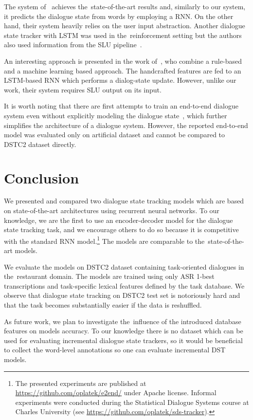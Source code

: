 \documentclass{itatnew}
\def\PB#1{\textcolor{red}{PB: \textit{#1}}}
\begin{document}
The system of~\citet{henderson2014word} achieves the~state-of-the-art results and, similarly to our system, it predicts the dialogue state from words by employing a RNN.
On the other hand, their system heavily relies on the user input abstraction.
Another dialogue state tracker with LSTM was used in the~reinforcement setting but the authors also used information from the SLU pipeline~\cite{lee2016dialog}.

An interesting approach is presented in the work of~\citet{vodolan2015hybrid}, who combine a rule-based and a machine learning based approach.
The handcrafted features are fed to an LSTM-based RNN which performs a dialog-state update.
However, unlike our work, their system requires SLU output on its input.

It is worth noting that there are first attempts to train an end-to-end dialogue system even without explicitly modeling the dialogue state~\cite{bordes2016learning}, which further simplifies the architecture of a dialogue system.
However, the reported end-to-end model was evaluated only on artificial dataset and cannot be compared to DSTC2 dataset directly.

\section{Conclusion}\label{sec:conc}
We presented and compared two dialogue state tracking models which are based on state-of-the-art architectures using recurrent neural networks.
To our knowledge, we are the first to use an encoder-decoder model for the dialogue state tracking task, and we encourage others to do so because it is competitive with the standard RNN model.\footnote{The presented experiments are published at \url{https://github.com/oplatek/e2end/} under Apache license. Informal experiments were conducted during the Statistical Dialogue Systems course at Charles University (see \url{https://github.com/oplatek/sds-tracker}).}
The models are comparable to the~state-of-the-art models.  %

We evaluate the models on DSTC2 dataset containing  task-oriented dialogues in the~restaurant domain. 
The models are trained using only ASR 1-best transcriptions and task-specific lexical features defined by the task database.
We observe that  dialogue state tracking on DSTC2 test set is notoriously hard and that the task becomes substantially easier if the data is reshuffled.

As future work, we plan to investigate the~influence of the introduced database features on models accuracy.
To our knowledge there is no dataset which can be used for evaluating incremental dialogue state trackers, so it would be beneficial to collect the word-level annotations so one can evaluate incremental DST models.

% 


\end{document}
